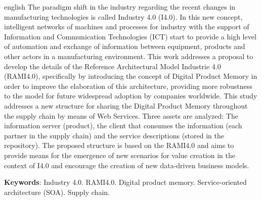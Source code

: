 \begin{resumo}[Abstract]
	\begin{otherlanguage*}{english}
		The paradigm shift in the industry regarding the recent changes in manufacturing technologies is called Industry 4.0 (I4.0). In this new concept, intelligent networks of machines and processes for industry with the support of Information and Communication Technologies (ICT) start to provide a high level of automation and exchange of information between equipment, products and other actors in a manufacturing environment.
		This work addresses a proposal to develop the details of the Reference Architectural Model Industrie 4.0 (RAMI4.0), specifically by introducing the concept of Digital Product Memory in order to improve the elaboration of this architecture, providing more robustness to the model for future widespread adoption by companies worldwide.
		This study addresses a new structure for sharing the Digital Product Memory throughout the supply chain by means of Web Services. Three assets are analyzed: The information server (product), the client that consumes the information (each partner in the supply chain) and the service descriptions (stored in the repository).
		The proposed structure is based on the RAMI4.0 and aims to provide means for the emergence of new scenarios for value creation in the context of I4.0 and encourage the creation of new data-driven business models.
		
		\vspace{\onelineskip}

		\noindent 
		\textbf{Keywords}: Industry 4.0. RAMI4.0. Digital product memory. Service-oriented architecture (SOA). Supply chain. 
	\end{otherlanguage*}
\end{resumo}

\listoffigures*
\cleardoublepage

\listoftables*
\cleardoublepage

